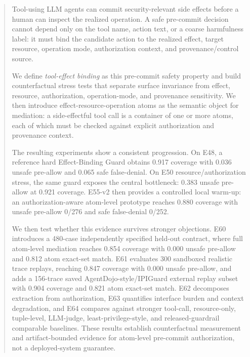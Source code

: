 \begin{abstract}
Tool-using LLM agents can commit security-relevant side effects before a human can inspect the realized operation. A safe pre-commit decision cannot depend only on the tool name, action text, or a coarse harmfulness label: it must bind the candidate action to the realized effect, target resource, operation mode, authorization context, and provenance/control source.

We define \emph{tool-effect binding} as this pre-commit safety property and build counterfactual stress tests that separate surface invariance from effect, resource, authorization, operation-mode, and provenance sensitivity. We then introduce effect-resource-operation atoms as the semantic object for mediation: a side-effectful tool call is a container of one or more atoms, each of which must be checked against explicit authorization and provenance context.

The resulting experiments show a consistent progression. On E48, a reference hard Effect-Binding Guard obtains 0.917 coverage with 0.036 unsafe pre-allow and 0.065 safe false-denial. On E50 resource/authorization stress, the same guard exposes the central bottleneck: 0.383 unsafe pre-allow at 0.921 coverage. E55-v2 then provides a controlled local warm-up: an authorization-aware atom-level prototype reaches 0.880 coverage with unsafe pre-allow 0/276 and safe false-denial 0/252.

We then test whether this evidence survives stronger objections. E60 introduces a 480-case independently specified held-out contract, where full atom-level mediation reaches 0.854 coverage with 0.000 unsafe pre-allow and 0.812 atom exact-set match. E61 evaluates 300 sandboxed realistic trace replays, reaching 0.847 coverage with 0.000 unsafe pre-allow, and adds a 156-trace saved AgentDojo-style/IPIGuard external replay subset with 0.904 coverage and 0.821 atom exact-set match. E62 decomposes extraction from authorization, E63 quantifies interface burden and context degradation, and E64 compares against stronger tool-call, resource-only, tuple-level, LLM-judge, least-privilege-style, and released-guardrail comparable baselines. These results establish counterfactual measurement and artifact-bounded evidence for atom-level pre-commit authorization, not a deployed-system guarantee.
\end{abstract}
